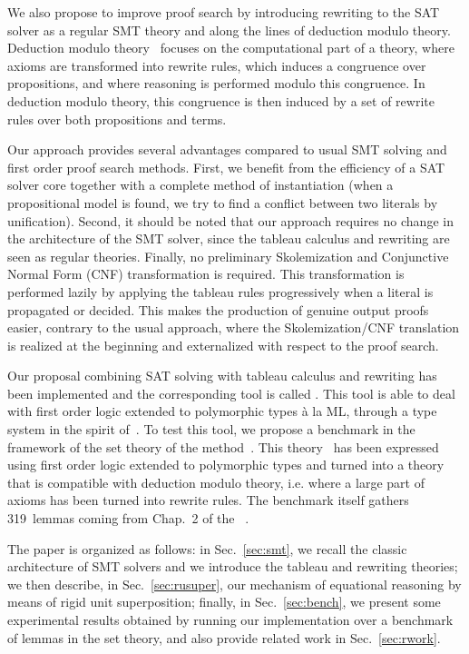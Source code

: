 We also propose to improve proof search by introducing rewriting to the SAT
solver as a regular SMT theory and along the lines of deduction modulo
theory. Deduction modulo theory~\cite{DA03} focuses on the computational part of
a theory, where axioms are transformed into rewrite rules, which induces a
congruence over propositions, and where reasoning is performed modulo this
congruence. In deduction modulo theory, this congruence is then induced by a set
of rewrite rules over both propositions and terms.

Our approach provides several advantages compared to usual SMT solving and first
order proof search methods. First, we benefit from the efficiency of a SAT
solver core together with a complete method of instantiation (when a
propositional model is found, we try to find a conflict between two literals by
unification). Second, it should be noted that our approach requires no change in
the architecture of the SMT solver, since the tableau calculus and rewriting are
seen as regular theories. Finally, no preliminary Skolemization and Conjunctive
Normal Form (CNF) transformation is required. This transformation is performed
lazily by applying the tableau rules progressively when a literal is propagated
or decided.  This makes the production of genuine output proofs easier, contrary
to the usual approach, where the Skolemization/CNF translation is realized at
the beginning and externalized with respect to the proof search.

Our proposal combining SAT solving with tableau calculus and rewriting has been
implemented and the corresponding tool is called \archsat{}. This tool is able
to deal with first order logic extended to polymorphic types à la ML, through a
type system in the spirit of~\cite{BP13}. To test this tool, we propose a
benchmark in the framework of the set theory of the \bmth{}
method~\cite{B-Book}. This theory~\cite{BA15} has been expressed using first
order logic extended to polymorphic types and turned into a theory that is
compatible with deduction modulo theory, i.e. where a large part of axioms has
been turned into rewrite rules. The benchmark itself gathers 319~lemmas coming
from Chap.~2 of the \bbook{}~\cite{B-Book}.

The paper is organized as follows: in Sec.~\ref{sec:smt}, we recall the classic
architecture of SMT solvers and we introduce the tableau and rewriting theories;
we then describe, in Sec.~\ref{sec:rusuper}, our mechanism of equational
reasoning by means of rigid unit superposition; finally, in
Sec.~\ref{sec:bench}, we present some experimental results obtained by running
our implementation over a benchmark of lemmas in the \bmth{} set theory, and
also provide related work in Sec.~\ref{sec:rwork}.
